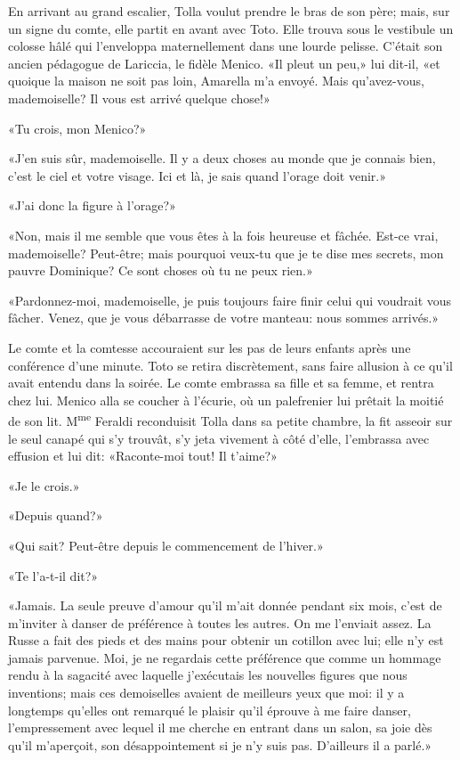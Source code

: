 En arrivant au grand escalier, Tolla voulut prendre le bras de son père;
mais, sur un signe du comte, elle partit en avant avec Toto. Elle trouva
sous le vestibule un colosse hâlé qui l'enveloppa maternellement dans
une lourde pelisse. C'était son ancien pédagogue de Lariccia, le fidèle
Menico. «Il pleut un peu,» lui dit-il, «et quoique la maison ne soit
pas loin, Amarella m'a envoyé. Mais qu'avez-vous, mademoiselle? Il vous
est arrivé quelque chose!»

«Tu crois, mon Menico?»

«J'en suis sûr, mademoiselle. Il y a deux choses au monde que je
connais bien, c'est le ciel et votre visage. Ici et là, je sais quand
l'orage doit venir.»

«J'ai donc la figure à l'orage?»

«Non, mais il me semble que vous êtes à la fois heureuse et fâchée.
Est-ce vrai, mademoiselle? Peut-être; mais pourquoi veux-tu que je te
dise mes secrets, mon pauvre Dominique? Ce sont choses où tu ne peux
rien.»

«Pardonnez-moi, mademoiselle, je puis toujours faire finir celui qui
voudrait vous fâcher. Venez, que je vous débarrasse de votre manteau:
nous sommes arrivés.»

Le comte et la comtesse accouraient sur les pas de leurs enfants après
une conférence d'une minute. Toto se retira discrètement, sans faire
allusion à ce qu'il avait entendu dans la soirée. Le comte embrassa sa
fille et sa femme, et rentra chez lui. Menico alla se coucher à
l'écurie, où un palefrenier lui prêtait la moitié de son lit.
M\textsuperscript{me} Feraldi reconduisit Tolla dans sa petite chambre,
la fit asseoir sur le seul canapé qui s'y trouvât, s'y jeta vivement à
côté d'elle, l'embrassa avec effusion et lui dit: «Raconte-moi tout!
Il t'aime?»

«Je le crois.»

«Depuis quand?»

«Qui sait? Peut-être depuis le commencement de l'hiver.»

«Te l'a-t-il dit?»

«Jamais. La seule preuve d'amour qu'il m'ait donnée pendant six
mois, c'est de m'inviter à danser de préférence à toutes les autres. On
me l'enviait assez. La Russe a fait des pieds et des mains pour obtenir
un cotillon avec lui; elle n'y est jamais parvenue. Moi, je ne regardais
cette préférence que comme un hommage rendu à la sagacité avec laquelle
j'exécutais les nouvelles figures que nous inventions; mais ces
demoiselles avaient de meilleurs yeux que moi: il y a longtemps qu'elles
ont remarqué le plaisir qu'il éprouve à me faire danser, l'empressement
avec lequel il me cherche en entrant dans un salon, sa joie dès qu'il
m'aperçoit, son désappointement si je n'y suis pas. D'ailleurs il a
parlé.»

